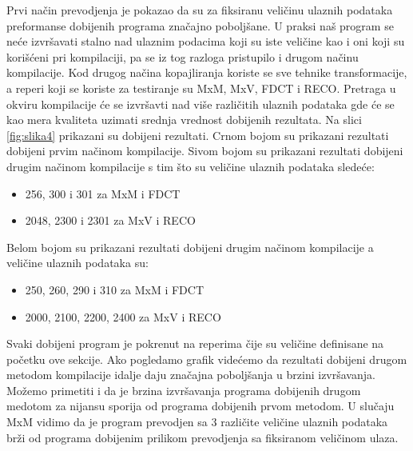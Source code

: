 \documentclass[a4paper]{article}
\begin{document}
Prvi način prevodjenja je pokazao da su za fiksiranu veličinu ulaznih podataka preformanse dobijenih programa značajno poboljšane.
U praksi naš program se neće izvršavati stalno nad ulaznim podacima koji su iste veličine kao i oni koji su korišćeni 
pri kompilaciji, pa se iz tog razloga pristupilo i drugom načinu kompilacije. Kod drugog načina kopajliranja 
koriste se sve tehnike transformacije, a reperi koji se koriste za testiranje su MxM, MxV, FDCT i RECO.
Pretraga u okviru kompilacije će se izvršavti nad više različitih ulaznih podataka gde će se kao mera kvaliteta uzimati
srednja vrednost dobijenih rezultata. Na slici \ref{fig:slika4} prikazani su dobijeni rezultati.
Crnom bojom su prikazani rezultati dobijeni prvim načinom kompilacije. Sivom bojom su prikazani rezultati dobijeni
drugim načinom kompilacije s tim što su veličine ulaznih podataka sledeće:
\begin{itemize}
\item 256, 300 i 301 za MxM i FDCT
\item 2048, 2300 i 2301 za MxV i RECO
\end{itemize}
Belom bojom su prikazani rezultati dobijeni drugim načinom kompilacije a veličine ulaznih podataka su:
\begin{itemize}
\item 250, 260, 290 i 310 za MxM i FDCT
\item 2000, 2100, 2200, 2400 za MxV i RECO
\end{itemize}
Svaki dobijeni program je pokrenut na reperima čije su veličine definisane na početku ove sekcije.
Ako pogledamo grafik videćemo da rezultati dobijeni drugom metodom kompilacije idalje daju značajna poboljšanja 
u brzini izvršavanja. Možemo primetiti i da je brzina izvršavanja programa dobijenih drugom medotom za nijansu 
sporija od programa dobijenih prvom metodom. U slučaju MxM vidimo da je program prevodjen sa 3 različite veličine 
ulaznih podataka brži od programa dobijenim prilikom prevodjenja sa fiksiranom veličinom ulaza.
\end{document}
